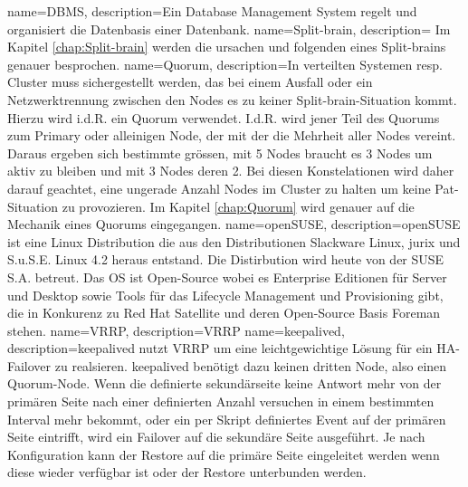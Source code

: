{
        name=DBMS,
        description={Ein Database Management System regelt und organisiert die Datenbasis einer Datenbank\cite{8XWD67EM}.}
}
{
        name=Split-brain,
        description={
%        
        Im Kapitel \autoref{chap:Split-brain} werden die ursachen und folgenden eines Split-brains genauer besprochen.
        }
}
{
        name=Quorum,
        description={In verteilten Systemen resp. Cluster muss sichergestellt werden, das bei einem Ausfall oder ein Netzwerktrennung zwischen den Nodes es zu keiner \Gls{Split-brain}-Situation kommt.
        Hierzu wird i.d.R. ein Quorum verwendet.
        I.d.R. wird jener Teil des Quorums zum Primary oder alleinigen Node, der mit der die Mehrheit aller Nodes vereint. Daraus ergeben sich bestimmte grössen, mit 5 Nodes braucht es 3 Nodes um aktiv zu bleiben und mit 3 Nodes deren 2.
        Bei diesen Konstelationen wird daher darauf geachtet, eine ungerade Anzahl Nodes im Cluster zu halten um keine Pat-Situation zu provozieren.
%        
        Im Kapitel \autoref{chap:Quorum} wird genauer auf die Mechanik eines Quorums eingegangen.
        }
}
{
        name=openSUSE,
        description={openSUSE ist eine Linux Distribution die aus den Distributionen Slackware Linux, jurix und S.u.S.E. Linux 4.2 heraus entstand.
        Die Distirbution wird heute von der SUSE S.A. betreut.
        Das OS ist Open-Source wobei es Enterprise Editionen für Server und Desktop sowie Tools für das Lifecycle Management und Provisioning gibt,
        die in Konkurenz zu Red Hat Satellite und deren Open-Source Basis \Gls{Foreman} stehen.}
}
{
        name=VRRP,
        description={VRRP }
}
{
        name=keepalived,
        description={keepalived nutzt \Gls{VRRP} um eine leichtgewichtige Lösung für ein HA-\Gls{Failover} zu realsieren.
        keepalived benötigt dazu keinen dritten Node, also einen \Gls{Quorum}-Node.
        Wenn die definierte sekundärseite keine Antwort mehr von der primären Seite nach einer definierten Anzahl versuchen in einem bestimmten Interval mehr bekommt,
        oder ein per Skript definiertes Event auf der primären Seite eintrifft, wird ein \Gls{Failover} auf die sekundäre Seite ausgeführt.
        Je nach Konfiguration kann der Restore auf die primäre Seite eingeleitet werden wenn diese wieder verfügbar ist oder der Restore unterbunden werden\cite{5IP362SV,ZW4PA3EQ}.}
}